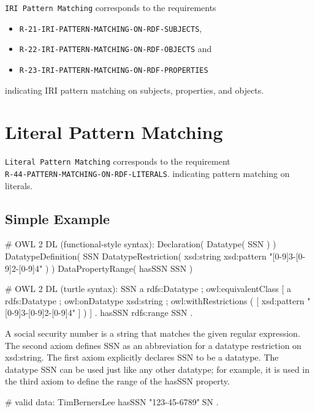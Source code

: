 \documentclass{llncs}
\newcommand{\ms}[1]{\texttt{#1}}
\begin{document}
\ms{IRI Pattern Matching} corresponds to the requirements
\begin{itemize}
	\item \ms{R-21-IRI-PATTERN-MATCHING-ON-RDF-SUBJECTS},
	\item \ms{R-22-IRI-PATTERN-MATCHING-ON-RDF-OBJECTS} and
	\item \ms{R-23-IRI-PATTERN-MATCHING-ON-RDF-PROPERTIES} 
\end{itemize}
indicating IRI pattern matching on subjects, properties, and objects.

\section{Literal Pattern Matching}

\ms{Literal Pattern Matching} corresponds to the requirement \\
\ms{R-44-PATTERN-MATCHING-ON-RDF-LITERALS}.
indicating pattern matching on literals.

\subsection{Simple Example}

\begin{ex}
# OWL 2 DL (functional-style syntax):
Declaration( Datatype( SSN ) ) 
DatatypeDefinition( 
    SSN
    DatatypeRestriction( xsd:string xsd:pattern "[0-9]{3}-[0-9]{2}-[0-9]{4}" ) )     
DataPropertyRange( hasSSN SSN ) 
\end{ex}

\begin{ex}
# OWL 2 DL (turtle syntax):
SSN 
    a rdfs:Datatype ;
    owl:equivalentClass [
        a rdfs:Datatype ;
        owl:onDatatype xsd:string ;
        owl:withRestrictions ( 
            [ xsd:pattern "[0-9]{3}-[0-9]{2}-[0-9]{4}" ] ) ] .
hasSSN rdfs:range SSN .
\end{ex}

A social security number is a string that matches the given regular expression. 
The second axiom defines SSN as an abbreviation for a datatype restriction on xsd:string. 
The first axiom explicitly declares SSN to be a datatype. 
The datatype SSN can be used just like any other datatype; 
for example, it is used in the third axiom to define the range of the hasSSN property. 

\begin{ex}
# valid data:
TimBernersLee
    hasSSN "123-45-6789"^^SSN .
\end{ex}
\end{document}
